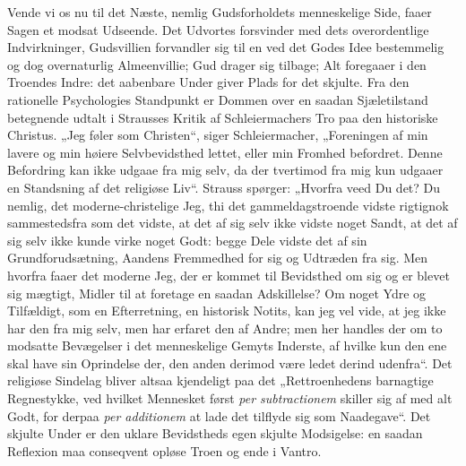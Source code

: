 \documentclass[12pt]{book}
\begin{document}
Vende vi os nu til det Næste, nemlig Gudsforholdets menneskelige
Side, faaer Sagen et modsat Udseende. Det Udvortes forsvinder med
dets overordentlige Indvirkninger, Gudsvillien forvandler sig til en
ved det Godes Idee bestemmelig og dog overnaturlig Almeenvillie; Gud
drager sig tilbage; Alt foregaaer i den Troendes Indre: det
aabenbare Under giver Plads for det skjulte. Fra den rationelle
Psychologies Standpunkt er Dommen over en saadan Sjæletilstand
betegnende udtalt i Strausses Kritik af Schleiermachers Tro paa den
historiske Christus. „Jeg føler som Christen“, siger Schleiermacher,
„Foreningen af min lavere og min høiere Selvbevidsthed lettet, eller
min Fromhed befordret. Denne Befordring kan ikke udgaae fra mig
selv, da der tvertimod fra mig kun udgaaer en Standsning af det
religiøse Liv“. Strauss spørger: „Hvorfra veed Du det? Du nemlig,
det moderne-christelige Jeg, thi det gammeldagstroende vidste
rigtignok sammestedsfra som det vidste, at det af sig selv ikke
vidste noget Sandt, at det af sig selv ikke kunde virke
noget Godt: begge Dele vidste det af sin Grundforudsætning, Aandens
Fremmedhed for sig og Udtræden fra sig. Men hvorfra faaer det
moderne Jeg, der er kommet til Bevidsthed om sig og er blevet sig
mægtigt, Midler til at foretage en saadan Adskillelse? Om noget Ydre
og Tilfældigt, som en Efterretning, en historisk Notits, kan jeg vel
vide, at jeg ikke har den fra mig selv, men har erfaret den af
Andre; men her handles der om to modsatte Bevægelser i det
menneskelige Gemyts Inderste, af hvilke kun den ene skal have sin
Oprindelse der, den anden derimod være ledet derind udenfra“. Det
religiøse Sindelag bliver altsaa kjendeligt paa det
„Rettroenhedens barnagtige Regnestykke, ved hvilket Mennesket først
\textit{per subtractionem} skiller sig af med alt Godt, for derpaa
\textit{per additionem} at lade det tilflyde sig som Naadegave“. Det
skjulte Under er den uklare Bevidstheds egen skjulte Modsigelse: en
saadan Reflexion maa conseqvent opløse Troen og ende i Vantro.
\end{document}
